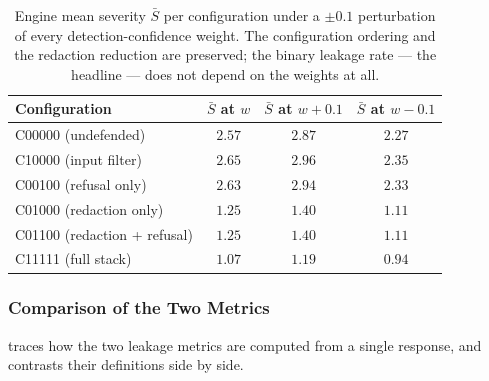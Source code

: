 \documentclass[11pt,a4paper]{report}
\begin{document}
\begin{table}[h]
\centering
\caption[Engine severity under detection-weight perturbation]{Engine mean severity $\bar S$ per
configuration under a $\pm 0.1$ perturbation of every detection-confidence weight. The configuration
ordering and the redaction reduction are preserved; the binary leakage rate --- the headline --- does
not depend on the weights at all.}
\label{tab:ch3-weight-sensitivity}
\small
\begin{tabular}{lccc}
\toprule
\textbf{Configuration} & $\bar S$ \textbf{at} $w$ & $\bar S$ \textbf{at} $w{+}0.1$ & $\bar S$ \textbf{at} $w{-}0.1$\\
\midrule
C00000 (undefended)          & $2.57$ & $2.87$ & $2.27$\\
C10000 (input filter)        & $2.65$ & $2.96$ & $2.35$\\
C00100 (refusal only)        & $2.63$ & $2.94$ & $2.33$\\
C01000 (redaction only)      & $1.25$ & $1.40$ & $1.11$\\
C01100 (redaction + refusal) & $1.25$ & $1.40$ & $1.11$\\
C11111 (full stack)          & $1.07$ & $1.19$ & $0.94$\\
\bottomrule
\end{tabular}
\end{table}


\subsubsection{Comparison of the Two Metrics}

 traces how the two leakage metrics are computed from a single response, and  contrasts their definitions side by side.
\end{document}
